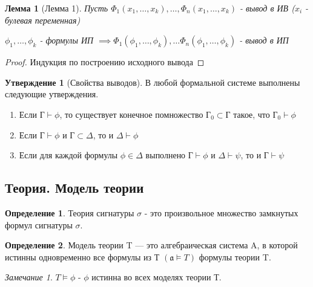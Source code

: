 \documentclass[a4paper]{article}
\newtheorem{lemma}{Лемма}[section]
\theoremstyle{definition}
\newtheorem*{definition}{Определение}
\newtheorem*{statement}{Утверждение}
\theoremstyle{remark}
\newtheorem*{remark}{Замечание}
\begin{document}
    \begin{lemma}[\hypertarget{Лемма 1}{Лемма 1}]
        Пусть $\Phi_1(x_1, \dots, x_k), \dots, \Phi_n(x_1, \dots, x_k)$ - вывод в ИВ ($x_i$ - булевая переменная)

        $\phi_1, \dots, \phi_k$ - формулы ИП $\implies \Phi_1(\phi_1, \dots, \phi_k), \dots \Phi_n(\phi_1, \dots, \phi_k)$ - вывод в ИП
    \end{lemma}
    \begin{proof}
        Индукция по построению исходного вывода
    \end{proof}
	\begin{statement}[Свойства выводов]
		В любой формальной системе выполнены следующие утверждения.
		\begin{enumerate}
			\item Если $Г \vdash \phi$, то существует конечное помножество $Г_0 \subset Г$ такое, что $Г_0 \vdash \phi$
			\item Если $Г \vdash \phi$ и $Г \subset \Delta$, то и $\Delta \vdash \phi$
			\item Если для каждой формулы $\phi \in \Delta$ выполнено $Г \vdash \phi$ и $\Delta \vdash \psi$, то и $Г \vdash \psi$
		\end{enumerate}
	\end{statement}
    \subsection{Теория. Модель теории}
    \begin{definition}
        Теория сигнатуры $\sigma$ - это произвольное множество замкнутых формул сигнатуры  $\sigma$.
    \end{definition}
    \begin{definition}
        Модель теории T — это алгебраическая система A, в которой истинны одновременно все формулы из Т $(\mathfrak{a}\models T)$
    формулы теории T.
    \end{definition}
    \begin{remark}
        $T\models \phi$ - $\phi$ истинна во всех моделях теории Т.
    \end{remark}
\end{document}
